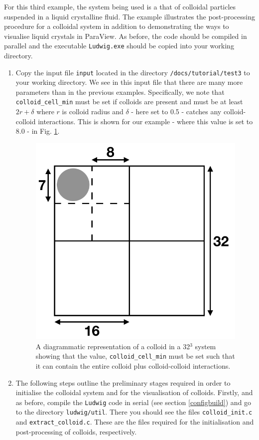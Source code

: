 \documentclass[11pt,twoside,a4paper]{article}
\begin{document}
For this third example, the system being used is a that of colloidal particles suspended in 
a liquid crystalline fluid.
The example illustrates the post-processing procedure for a colloidal system in addition to 
demonstrating the ways to visualise liquid crystals in ParaView. 
As before, the code should be compiled in parallel and the executable 
\texttt{Ludwig.exe} should be copied into your working directory.
\begin{enumerate}
\item Copy the input file \texttt{input} located in the directory 
\texttt{/docs/tutorial/test3} to your working directory. We see in this input file that 
there are many more parameters 
than in the previous examples. Specifically, we note that \texttt{colloid\_cell\_min} 
must be set if colloids are present and must be at least $2r + \delta$ where $r$ is colloid 
radius and $\delta$ - here set to 0.5 - catches any colloid-colloid interactions. This is shown for our example - where this value is set to 8.0 - in Fig. \ref{fig:colloid_int}.
 \begin{figure}[H]
\begin{center}
\includegraphics[width=0.5\linewidth]{colloidInit.png}
  \caption{A diagrammatic representation of a colloid in a 32$^3$ system showing that the value, \texttt{colloid\_cell\_min} must be set such that it can contain the entire colloid plus colloid-colloid interactions.}
  \label{fig:colloid_int}
  \end{center}
\end{figure}
\item The following steps outline the preliminary stages required in order to initialise the colloidal system and for the visualisation of colloids. Firstly, and as before, compile the \texttt{Ludwig} code in serial (see section \ref{configbuild}) and go to the directory \texttt{ludwig/util}. There you should see the files \texttt{colloid\_init.c} and \texttt{extract\_colloid.c}. These are the files required for the initialisation and post-processing of colloids, respectively.

\end{enumerate}
\end{document}
